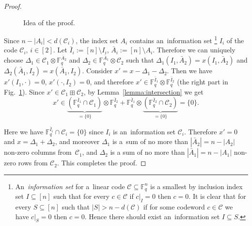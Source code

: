 \documentclass[11pt]{article}
\theoremstyle{plain}
\theoremstyle{definition}
\theoremstyle{remark}
\newcommand{\abs}[1]{\left\lvert #1 \right\rvert}
\newcommand{\cC}{\mathcal{C}}
\newcommand{\F}{\mathbb{F}}
\begin{document}
\begin{proof}
\begin{figure}[ht]
        \caption{Idea of the proof.}
        \label{fig:zeroangle}
    \end{figure}
    Since $n-|A_i|<d(\cC_i)$, the index set $A_i$ contains an~information set%
    \footnote{
        An~\emph{information set} for a~linear code $\cC\subseteq\F_q^n$ is a smallest by inclusion index set $I\subseteq [n]$ such that for every $c\in\cC$ if $c|_I = 0$ then $c = 0$.  It is clear that for every $S\subseteq [n]$ such that $\abs{S} > n - d(\cC)$ if for some codeword $c\in \cC$ we have $c|_S = 0$ then $c=0$. Hence there should exist an~information set $I\subseteq S$.
    } 
    $I_i$ of the code $\cC_i$, $i\in [2]$. Let $\bar I_i:=[n]\setminus I_i$, $\bar A_i:=[n]\setminus A_i$. Therefore we can uniquely choose $\Delta_1\in \cC_1\otimes \F_q ^{\bar A_2}$ and $\Delta_2\in\F_q^{\bar A_1}\otimes \cC_2$ such that $\Delta_1(I_1,\bar A_2)=x(I_1,\bar A_2)$ and $\Delta_2(\bar A_1, I_2)=x(\bar A_1, I_2)$. Consider $x'=x-\Delta_1-\Delta_2$. Then we have $x'(I_1,\cdot)=0$, $x'(\cdot,I_2)=0$, and therefore $x'\in \F_q^{\bar I_1}\otimes \F_q^{\bar I_2}$ (the right part in Fig.~\ref{fig:zeroangle}). Since $x'\in \cC_1\boxplus \cC_2$, by Lemma~\ref{lemma:intersection} we get  
    \[
    x'\in \underbrace{(\F_q^{\bar I_1}\cap \cC_1)}_{=\{0\}}\otimes \F_q^{\bar I_2}+\F_q^{\bar I_1}\otimes \underbrace{(\F_q^{\bar I_2}\cap \cC_2)}_{=\{0\}}=\{0\}.
    \]
    
    Here we have $\F_q^{\bar I_i}\cap \cC_i=\{0\}$ since $I_i$ is an~information set $\cC_i$. Therefore $x'=0$ and $x=\Delta_1+\Delta_2$, and moreover $\Delta_1$ is a~sum of  no more than $|\bar A_2|=n-|A_2|$ non-zero columns from~$\cC_1$, and  $\Delta_2$ is a sum of no more than $|\bar A_1|=n-|A_1|$ non-zero rows from $\cC_2$. This completes the proof.
\end{proof}
\end{document}
